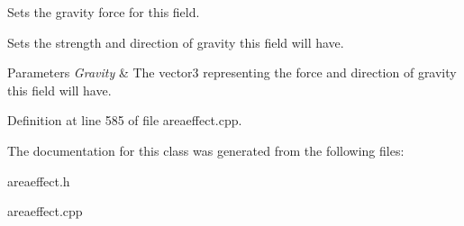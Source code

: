 Sets the gravity force for this field. 

Sets the strength and direction of gravity this field will have. 
\begin{DoxyParams}{Parameters}
{\em Gravity} & The vector3 representing the force and direction of gravity this field will have. \\
\hline
\end{DoxyParams}


Definition at line 585 of file areaeffect.cpp.



The documentation for this class was generated from the following files:\begin{DoxyCompactItemize}
\item 
areaeffect.h\item 
areaeffect.cpp\end{DoxyCompactItemize}
